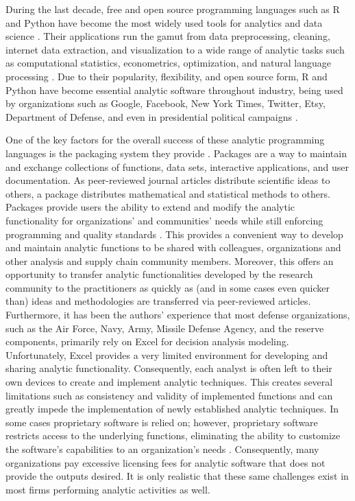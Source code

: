 \documentclass[twocolumn]{svjour3}       %
\begin{document}
During the last decade, free and open source programming languages such as R and Python have become the most widely used tools for analytics and data science \citep{w14}. Their applications run the gamut from data preprocessing, cleaning, internet data extraction, and visualization to a wide range of analytic tasks such as computational statistics, econometrics, optimization, and natural language processing \citep{b16}. Due to their popularity, flexibility, and open source form, R and Python have become essential analytic software throughout industry, being used by organizations such as Google, Facebook, New York Times, Twitter, Etsy, Department of Defense, and even in presidential political campaigns \citep{b16}. 

One of the key factors for the overall success of these analytic programming languages is the packaging system they provide \citep{t17}. Packages are a way to maintain and exchange collections of functions, data sets, interactive applications, and user documentation.  As peer-reviewed journal articles distribute scientific ideas to others, a package distributes mathematical and statistical methods to others.  Packages provide users the ability to extend and modify the analytic functionality for organizations' and communities' needs while still enforcing programming and quality standards \citep{bj16}.  This provides a convenient way to develop and maintain analytic functions to be shared with colleagues, organizations and other analysis and supply chain community members.  Moreover, this offers an opportunity to transfer analytic functionalities developed by the research community to the practitioners as quickly as (and in some cases even quicker than) ideas and methodologies are transferred via peer-reviewed articles. Furthermore, it has been the authors' experience that most defense organizations, such as the Air Force, Navy, Army, Missile Defense Agency, and the reserve components, primarily rely on Excel for decision analysis modeling.  Unfortunately, Excel provides a very limited environment for developing and sharing analytic functionality. Consequently, each analyst is often left to their own devices to create and implement analytic techniques. This creates several limitations such as consistency and validity of implemented functions and can greatly impede the implementation of newly established analytic techniques.  In some cases proprietary software is relied on; however, proprietary software restricts access to the underlying functions, eliminating the ability to customize the software's capabilities to an organization's needs \citep{bj16}.  Consequently, many organizations pay excessive licensing fees for analytic software that does not provide the outputs desired. It is only realistic that these same challenges exist in most firms performing analytic activities as well.
\end{document}
